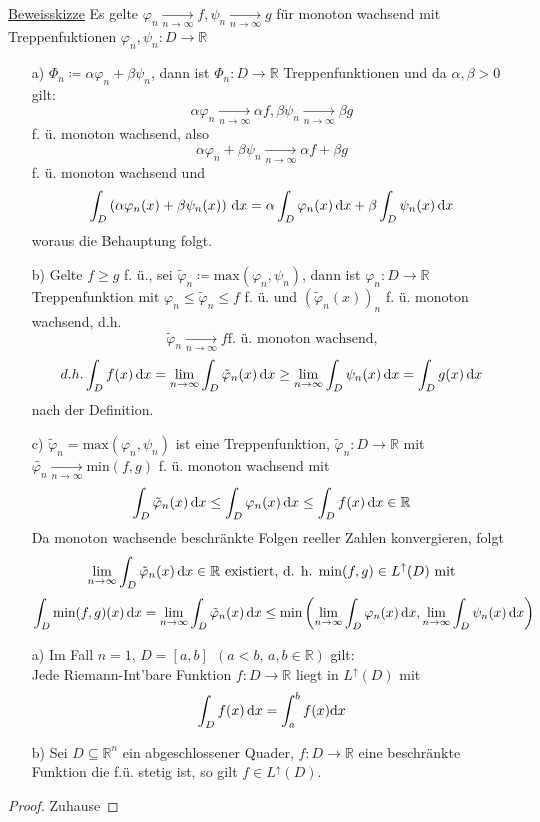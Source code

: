 \underline{Beweisskizze} Es gelte $\varphi_n \xrightarrow[n \to \infty]{} f, \psi_n \xrightarrow[n \to \infty]{}g$ für monoton wachsend mit Treppenfuktionen $\varphi_n, \psi_n \colon D \to \mathbb{R}$
\begin{itemize}
	\item[a)] $\Phi_n \coloneqq \alpha \varphi_n + \beta \psi_n$, dann ist $\Phi_n \colon D \to \mathbb{R}$ Treppenfunktionen und da $\alpha, \beta >0$ gilt: \[\alpha\varphi_n \xrightarrow[n \to \infty]{}\alpha f, \beta\psi_n \xrightarrow[n \to \infty]{}\beta g\] f. ü. monoton wachsend, also \[\alpha \varphi_n + \beta \psi_n \xrightarrow[n \to \infty]{}\alpha f + \beta g\] f. ü. monoton wachsend und \[\int_{D} \left(\alpha\varphi_n(x) + \beta\psi_n(x)\right) \,\text{d}x = \alpha \int_{D} \varphi_n(x)  \,\text{d}x + \beta\int_{D} \psi_n(x) \,\text{d}x\] woraus die Behauptung folgt.
	\item[b)] Gelte $f \geq g$ f. ü., sei $\tilde{\varphi}_n \coloneqq \text{max}(\varphi_n, \psi_n)$, dann ist $\varphi_n \colon D \to  \mathbb{R}$ Treppenfunktion mit $\varphi_n \leq \tilde{\varphi}_n \leq f$ f. ü. und $(\tilde{\varphi}_n(x))_n$ f. ü. monoton wachsend, d.h. \[\tilde{\varphi}_n \xrightarrow[n \to \infty]{}f \text{f. ü. monoton wachsend,}\]
	      \[d.h. \int_{D} f(x) \,\text{d}x = \lim_{n \to \infty} \int_{D} \tilde{\varphi}_n(x) \,\text{d}x \geq \lim_{n \to \infty} \int_{D} \psi_n(x) \,\text{d}x = \int_{D} g(x) \,\text{d}x\]
	      nach der Definition.
	\item[c)] $\tilde{\varphi}_n = \text{max}(\varphi_n,\psi_n)$ ist eine Treppenfunktion, $\tilde{\varphi}_n \colon D \to \mathbb{R}$ mit $\tilde{\varphi_n} \xrightarrow[n \to \infty]{} \text{min}(f,g)$ f. ü. monoton wachsend mit \[\int_{D} \tilde{\varphi}_n(x) \,\text{d}x \leq \int_{D} \varphi_n(x) \,\text{d}x \leq \int_{D} f(x) \,\text{d}x \in \mathbb{R}\] Da monoton wachsende beschränkte Folgen reeller Zahlen konvergieren, folgt \[\lim_{n \to \infty} \int_{D} \tilde{\varphi}_n(x) \,\text{d}x \in \mathbb{R} \text{ existiert, d. h. min}(f,g) \in L^\uparrow(D) \text{ mit}\] \[\int_{D} \text{min}(f,g)(x) \,\text{d}x = \lim_{n \to \infty} \int_{D} \tilde{\varphi}_n(x) \,\text{d}x \leq \text{min}\left(\lim_{n \to \infty} \int_{D} \varphi_n(x) \,\text{d}x, \lim_{n \to \infty} \int_{D} \psi_n(x) \,\text{d}x\right)\]
\end{itemize}

\begin{satz}\leavevmode\label{Intbar:Lebesgue}
	\begin{itemize}
		\item[a)] Im Fall $n=1$, $D=[a, b]\ \ (a<b,\, a,b\in\mathbb{R})$ gilt:\\
		Jede Riemann-Int'bare Funktion $f\colon D\to\mathbb{R}$ liegt in $L^\uparrow(D)$ mit \[\int_{D} f(x) \,\text{d}x=\int_a^bf(x) \text{d}x\]
		\item[b)] Sei $D\subseteq \mathbb{R}^n$ ein abgeschlossener Quader, $f\colon D\to\mathbb{R}$ eine beschränkte Funktion die f.ü. stetig ist, so gilt $f\in L^\uparrow(D)$.
	\end{itemize}
\end{satz}
\begin{proof}
	Zuhause
\end{proof}

